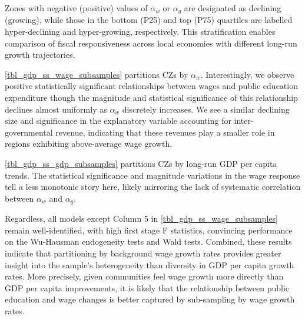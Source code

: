 \documentclass[
  10pt,
]{article}
\begin{document}
Zones with negative (positive) values of \(\alpha_{w}\) or \(\alpha_g\)
are designated as declining (growing), while those in the bottom (P25)
and top (P75) quartiles are labelled hyper-declining and hyper-growing,
respectively. This stratification enables comparison of fiscal
responsiveness across local economies with different long-run growth
trajectories.

\autoref{tbl_gdp_ss_wage_subsamples} partitions CZs by \(\alpha_w\).
Interestingly, we observe positive statistically significant
relationships between wages and public education expenditure though the
magnitude and statistical significance of this relationship declines
almost uniformly as \(\alpha_w\) discretely increases. We see a similar
declining size and significance in the explanatory variable accounting
for inter-governmental revenue, indicating that these revenues play a
smaller role in regions exhibiting above-average wage growth.

\autoref{tbl_gdp_ss_gdp_subsamples} partitions CZs by long-run GDP per
capita trends. The statistical significance and magnitude variations in
the wage response tell a less monotonic story here, likely mirroring the
lack of systematic correlation between \(\alpha_w\) and \(\alpha_g\).

Regardless, all models except Column 5 in
\autoref{tbl_gdp_ss_wage_subsamples} remain well-identified, with high
first stage F statistics, convincing performance on the Wu-Hausman
endogeneity tests and Wald tests. Combined, these results indicate that
partitioning by background wage growth rates provides greater insight
into the sample's heterogeneity than diversity in GDP per capita growth
rates. More precisely, given communities feel wage growth more directly
than GDP per capita improvements, it is likely that the relationship
between public education and wage changes is better captured by
sub-sampling by wage growth rates.

\FloatBarrier

\FloatBarrier
\end{document}
